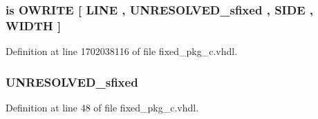 \subsubsection[{O\+C\+T\+A\+L\+\_\+\+W\+R\+I\+T\+E}]{ {\bfseries \textcolor{keywordflow}{is}\textcolor{vhdlchar}{ }\textcolor{vhdlchar}{O\+W\+R\+I\+T\+E}\textcolor{vhdlchar}{ }\textcolor{vhdlchar}{\mbox{[}}\textcolor{vhdlchar}{ }\textcolor{vhdlchar}{L\+I\+N\+E}\textcolor{vhdlchar}{ }\textcolor{vhdlchar}{,}\textcolor{vhdlchar}{ }{\bfseries {\bf U\+N\+R\+E\+S\+O\+L\+V\+E\+D\+\_\+sfixed}} \textcolor{vhdlchar}{ }\textcolor{vhdlchar}{,}\textcolor{vhdlchar}{ }\textcolor{vhdlchar}{S\+I\+D\+E}\textcolor{vhdlchar}{ }\textcolor{vhdlchar}{,}\textcolor{vhdlchar}{ }\textcolor{vhdlchar}{W\+I\+D\+T\+H}\textcolor{vhdlchar}{ }\textcolor{vhdlchar}{\mbox{]}}\textcolor{vhdlchar}{ }} \hspace{0.3cm}{\ttfamily [Alias]}}\label{classfixed__pkg_a8d2e6245c720509e99289ab1f28d13b2}


Definition at line 1702038116 of file fixed\+\_\+pkg\+\_\+c.\+vhdl.

\hypertarget{classfixed__pkg_a31c0ff6a2cca69b7f3b2475ca0f71e0c}{}
\subsubsection[{sfixed}]{ {\bfseries {\bfseries {\bf U\+N\+R\+E\+S\+O\+L\+V\+E\+D\+\_\+sfixed}} \textcolor{vhdlchar}{ }} \hspace{0.3cm}{\ttfamily [Subtype]}}\label{classfixed__pkg_a31c0ff6a2cca69b7f3b2475ca0f71e0c}


Definition at line 48 of file fixed\+\_\+pkg\+\_\+c.\+vhdl.

\hypertarget{classfixed__pkg_aa4b2b25246a821511120e3149b003563}{}
\subsubsection[{S\+T\+D\+\_\+\+L\+O\+G\+I\+C\+\_\+1164}]{\hspace{0.3cm}{\ttfamily [Package]}}\label{classfixed__pkg_aa4b2b25246a821511120e3149b003563}


